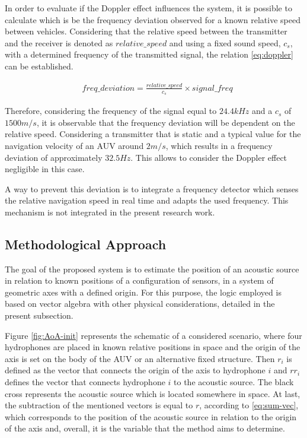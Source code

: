 In order to evaluate if the Doppler effect influences the system, it is possible to calculate which is be the frequency deviation observed for a known relative speed between vehicles. Considering that the relative speed between the transmitter and the receiver is denoted as $relative\_speed$ and using a fixed sound speed, $c_s$, with a determined frequency of the transmitted signal, the relation \ref{eq:doppler} can be established. 

\begin{eqnarray}
&freq\_deviation = \frac{relative\_speed}{c_s} \times signal\_freq
\label{eq:doppler}
\end{eqnarray}

Therefore, considering the frequency of the signal equal to $24.4kHz$ and a $c_s$ of $1500 m/s$, it is observable that the frequency deviation will be dependent on the relative speed. Considering a transmitter that is static and a typical value for the navigation velocity of an AUV around $2 m/s$, which results in a frequency deviation of approximately $32.5Hz$. This allows to consider the Doppler effect negligible in this case.

A way to prevent this deviation is to integrate a frequency detector which senses the relative navigation speed in real time and adapts the used frequency. This mechanism is not integrated in the present research work.

\subsection{Methodological Approach} \label{subsec:estimator}

The goal of the proposed system is to estimate the position of an acoustic source in relation to known positions of a configuration of sensors, in a system of geometric axes with a defined origin. For this purpose, the logic employed is based on vector algebra with other physical considerations, detailed in the present subsection. 

Figure \ref{fig:AoA-init} represents the schematic of a considered scenario, where four hydrophones are placed in known relative positions in space and the origin of the axis is set on the body of the AUV or an alternative fixed structure. Then $r_i$ is defined as the vector that connects the origin of the axis to hydrophone $i$ and $rr_i$ defines the vector that connects hydrophone $i$ to the acoustic source. The black cross represents the acoustic source which is located somewhere in space. At last, the subtraction of the mentioned vectors is equal to $r$, according to \ref{eq:sum-vec}, which corresponds to the position of the acoustic source in relation to the origin of the axis and, overall, it is the variable that the method aims to determine.

